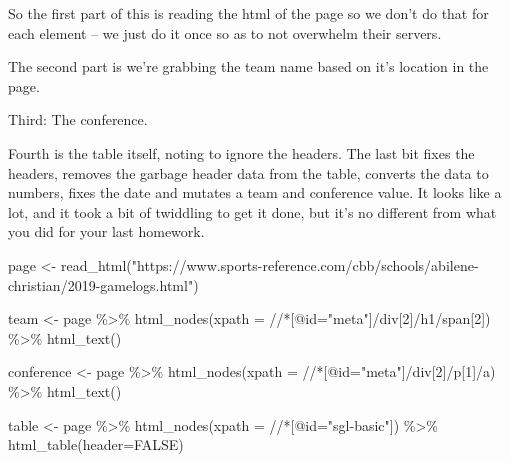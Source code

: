 \documentclass[
]{book}
\newenvironment{Shaded}{\begin{snugshade}}{\end{snugshade}}
\newcommand{\AttributeTok}[1]{\textcolor[rgb]{0.77,0.63,0.00}{#1}}
\newcommand{\ConstantTok}[1]{\textcolor[rgb]{0.00,0.00,0.00}{#1}}
\newcommand{\FunctionTok}[1]{\textcolor[rgb]{0.00,0.00,0.00}{#1}}
\newcommand{\NormalTok}[1]{#1}
\newcommand{\OtherTok}[1]{\textcolor[rgb]{0.56,0.35,0.01}{#1}}
\newcommand{\SpecialCharTok}[1]{\textcolor[rgb]{0.00,0.00,0.00}{#1}}
\newcommand{\StringTok}[1]{\textcolor[rgb]{0.31,0.60,0.02}{#1}}
\begin{document}
So the first part of this is reading the html of the page so we don't do that for each element -- we just do it once so as to not overwhelm their servers.

The second part is we're grabbing the team name based on it's location in the page.

Third: The conference.

Fourth is the table itself, noting to ignore the headers. The last bit fixes the headers, removes the garbage header data from the table, converts the data to numbers, fixes the date and mutates a team and conference value. It looks like a lot, and it took a bit of twiddling to get it done, but it's no different from what you did for your last homework.

\begin{Shaded}
\begin{Highlighting}[]
\NormalTok{page }\OtherTok{\textless{}{-}} \FunctionTok{read\_html}\NormalTok{(}\StringTok{"https://www.sports{-}reference.com/cbb/schools/abilene{-}christian/2019{-}gamelogs.html"}\NormalTok{)}
  
\NormalTok{team }\OtherTok{\textless{}{-}}\NormalTok{ page }\SpecialCharTok{\%\textgreater{}\%}
  \FunctionTok{html\_nodes}\NormalTok{(}\AttributeTok{xpath =} \StringTok{\textquotesingle{}//*[@id="meta"]/div[2]/h1/span[2]\textquotesingle{}}\NormalTok{) }\SpecialCharTok{\%\textgreater{}\%}
  \FunctionTok{html\_text}\NormalTok{()}

\NormalTok{conference }\OtherTok{\textless{}{-}}\NormalTok{ page }\SpecialCharTok{\%\textgreater{}\%}
    \FunctionTok{html\_nodes}\NormalTok{(}\AttributeTok{xpath =} \StringTok{\textquotesingle{}//*[@id="meta"]/div[2]/p[1]/a\textquotesingle{}}\NormalTok{) }\SpecialCharTok{\%\textgreater{}\%}
    \FunctionTok{html\_text}\NormalTok{()}

\NormalTok{table }\OtherTok{\textless{}{-}}\NormalTok{ page }\SpecialCharTok{\%\textgreater{}\%}
  \FunctionTok{html\_nodes}\NormalTok{(}\AttributeTok{xpath =} \StringTok{\textquotesingle{}//*[@id="sgl{-}basic"]\textquotesingle{}}\NormalTok{) }\SpecialCharTok{\%\textgreater{}\%}
  \FunctionTok{html\_table}\NormalTok{(}\AttributeTok{header=}\ConstantTok{FALSE}\NormalTok{)}


\end{Highlighting}
\end{Shaded}
\end{document}
